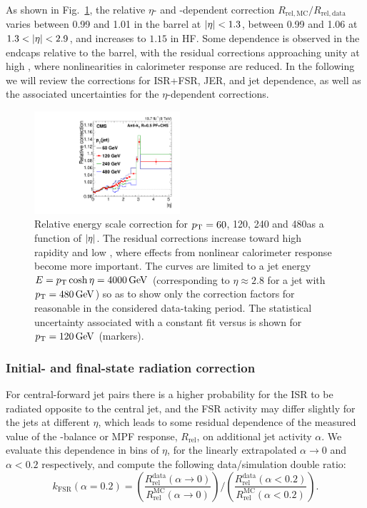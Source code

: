 \documentclass[11pt,twoside,a4paper,cmspaper,final,collab]{cms-tdr}
\begin{document}
As shown in Fig.~\ref{fig:L2resPR}, the relative $\eta$- and \pt-dependent correction $R_\mathrm{rel, MC}/R_\mathrm{rel, data}$ varies between 0.99 and 1.01 in the barrel at $\lvert \eta \rvert<1.3$, between 0.99 and 1.06 at $1.3<\lvert \eta \rvert<2.9$, and increases to $1.15$ in HF. Some \pt dependence is observed in the endcaps relative to the barrel, with the residual corrections approaching unity at high \pt, where nonlinearities in calorimeter response are reduced.
In the following we will review the corrections for ISR+FSR, JER, and jet \pt dependence, as well as the associated uncertainties for the $\eta$-dependent corrections.

\begin{figure}[htbp!]
\centering
\includegraphics[width=0.48\textwidth]{Figure_015.pdf}
\caption{\label{fig:L2resPR}
Relative energy scale correction for $p_{\mathrm{T}}=60$, 120, 240 and 480\GeV as a function of $\lvert \eta \rvert$. The residual corrections increase toward high rapidity and low \pt, where effects from nonlinear calorimeter response become more important. The curves are limited to a jet energy $E=p_{\mathrm{T}}\cosh\eta=4000\,\text{Ge\hspace{-.08em}V}$ (corresponding to $\eta\approx 2.8$ for a jet with $p_{\mathrm{T}}=480\,\text{Ge\hspace{-.08em}V}$) so as to show only the correction factors for reasonable \pt in the considered data-taking period. The statistical uncertainty associated with a constant fit versus \pt is shown for $p_{\mathrm{T}}=120\,\text{Ge\hspace{-.08em}V}$ (markers).
}
\end{figure}

\subsubsection*{Initial- and final-state radiation correction}\label{sec:l2fsr}

For central-forward jet pairs there is a higher probability for the ISR to be radiated opposite to the central jet, and the FSR activity may differ slightly for the jets at different $\eta$, which leads to some residual dependence of the measured value of the \pt-balance or MPF response, $R_\text{rel}$, on additional jet activity $\alpha$.
We evaluate this dependence in bins of $\eta$, for the linearly extrapolated $\alpha\to 0$ and $\alpha<0.2$ respectively, and compute the following data/simulation double ratio:
\begin{equation}
\label{eq:kFSRdataOverMC}
 k_\mathrm{FSR}(\alpha=0.2) = {\left(\frac{R_\text{rel}^\text{data}(\alpha\to 0)}{R_\text{rel}^\mathrm{MC}(\alpha\to 0)} \right)} \Bigg/ { \left(\frac{R_\text{rel}^\text{data}(\alpha<0.2)}{R_\text{rel}^\mathrm{MC}(\alpha<0.2)} \right) }.
\end{equation}
\end{document}
